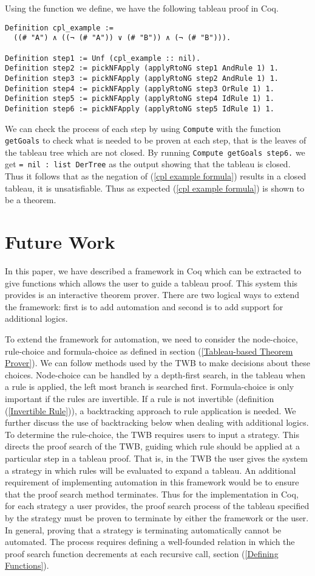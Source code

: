 \documentclass{llncs}
\begin{document}
Using the function we define, we have the following tableau proof in Coq.
%
\begin{verbatim}
Definition cpl_example :=
  ((# "A") ∧ ((¬ (# "A")) ∨ (# "B")) ∧ (¬ (# "B"))).

Definition step1 := Unf (cpl_example :: nil).
Definition step2 := pickNFApply (applyRtoNG step1 AndRule 1) 1.
Definition step3 := pickNFApply (applyRtoNG step2 AndRule 1) 1.
Definition step4 := pickNFApply (applyRtoNG step3 OrRule 1) 1.
Definition step5 := pickNFApply (applyRtoNG step4 IdRule 1) 1.
Definition step6 := pickNFApply (applyRtoNG step5 IdRule 1) 1.
\end{verbatim}
%
We can check the process of each step by using \verb+Compute+ with the function
\verb+getGoals+ to check what is needed to be proven at each step, that is the
leaves of the tableau tree which are not closed.
By running \verb+Compute getGoals step6.+ we get \verb+= nil : list DerTree+ as
the output showing that the tableau is closed. Thus it follows that as the
negation of (\ref{cpl example formula}) results in a closed tableau, it is 
unsatisfiable. Thus as expected (\ref{cpl example formula}) is shown to be a
theorem.
%
\section{Future Work}
%
In this paper, we have described a framework in Coq which can be extracted to
give functions which allows the user to guide a tableau proof. This system this
provides is an interactive theorem prover. There are two logical ways to extend
the framework: first is to add automation and second is to add support for
additional logics.

To extend the framework for automation, we need to consider the node-choice,
rule-choice and formula-choice as defined in section (\ref{Tableau-based
Theorem Prover}). We can follow methods used by the TWB
\cite{abate2007tableau} to make decisions about these choices.  Node-choice can
be handled by a depth-first search, in the tableau when a rule is applied, the
left most branch is searched first. Formula-choice is only important if the
rules are invertible. If a rule is not invertible (definition (\ref{Invertible
Rule})), a backtracking approach to rule application is needed. We further
discuss the use of backtracking below when dealing with additional logics. To
determine the rule-choice, the TWB requires users to input a
strategy. This directs the proof search of the TWB, guiding
which rule should be applied at a particular step in a tableau proof. That is,
in the TWB the user gives the system a strategy in which rules
will be evaluated to expand a tableau. An additional requirement of
implementing automation in this framework would be to ensure that the proof
search method terminates. Thus for the implementation in Coq, for each strategy
a user provides, the proof search process of the tableau specified by the
strategy must be proven to terminate by either the framework or the user. In
general, proving that a strategy is terminating automatically cannot be
automated. The process requires defining a well-founded relation in which the
proof search function decrements at each recursive call, section (\ref{Defining
Functions}).
\end{document}
